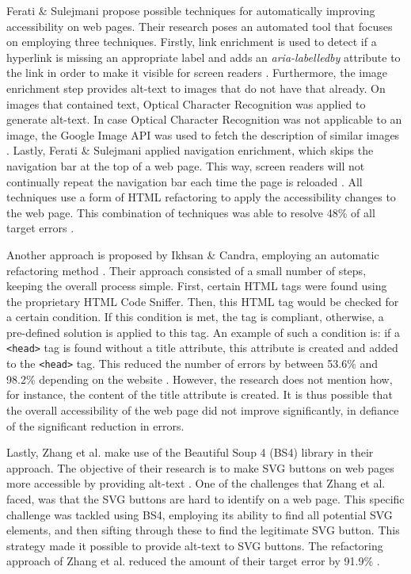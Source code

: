 Ferati \& Sulejmani propose possible techniques for automatically improving accessibility on web pages\cite{Ferati2016}. Their research poses an automated tool that focuses on employing three techniques. Firstly, link enrichment is used to detect if a hyperlink is missing an appropriate label and adds an \textit{aria-labelledby} attribute to the link in order to make it visible for screen readers \cite{Ferati2016}. Furthermore, the image enrichment step provides alt-text to images that do not have that already. On images that contained text, Optical Character Recognition was applied to generate alt-text. In case Optical Character Recognition was not applicable to an image, the Google Image API was used to fetch the description of similar images \cite{Ferati2016}. Lastly, Ferati \& Sulejmani applied navigation enrichment, which skips the navigation bar at the top of a web page. This way, screen readers will not continually repeat the navigation bar each time the page is reloaded \cite{Ferati2016}. All techniques use a form of HTML refactoring to apply the accessibility changes to the web page. This combination of techniques was able to resolve 48\% of all target errors \cite{Ferati2016}.

Another approach is proposed by Ikhsan \& Candra, employing an automatic refactoring method \cite{Ikhsan2018}. Their approach consisted of a small number of steps, keeping the overall process simple. First, certain HTML tags were found using the proprietary HTML Code Sniffer. Then, this HTML tag would be checked for a certain condition. If this condition is met, the tag is compliant, otherwise, a pre-defined solution is applied to this tag. An example of such a condition is: if a \texttt{<head>} tag is found without a title attribute, this attribute is created and added to the  \texttt{<head>} tag\cite{Ikhsan2018}. This reduced the number of errors by between 53.6\% and 98.2\% depending on the website \cite{Ikhsan2018}. However, the research does not mention how, for instance, the content of the title attribute is created. It is thus possible that the overall accessibility of the web page did not improve significantly, in defiance of the significant reduction in errors.

Lastly, Zhang et al. make use of the Beautiful Soup 4 (BS4) library in their approach. The objective of their research is to make SVG buttons on web pages more accessible by providing alt-text \cite{Zhang2024}. One of the challenges that Zhang et al. faced, was that the SVG buttons are hard to identify on a web page. This specific challenge was tackled using BS4, employing its ability to find all potential SVG elements, and then sifting through these to find the legitimate SVG button. This strategy made it possible to provide alt-text to SVG buttons. The refactoring approach of Zhang et al. reduced the amount of their target error by 91.9\% \cite{Zhang2024}.